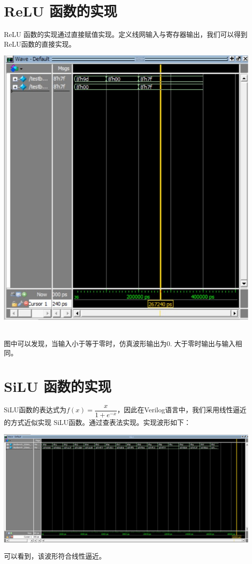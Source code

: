 \documentclass[a4paper]{article}
\begin{document}
\section{ReLU 函数的实现}
ReLU 函数的实现通过直接赋值实现。定义线网输入与寄存器输出，我们可以得到ReLU函数的直接实现。\\
\centerline{\includegraphics[scale=1.0]{relu.jpg}}\\
图中可以发现，当输入小于等于零时，仿真波形输出为0. 大于零时输出与输入相同。
\section{SiLU 函数的实现}
SiLU函数的表达式为$f(x)=\dfrac{x}{1+e^{-x}}$，因此在Verilog语言中，我们采用线性逼近的方式近似实现
SiLU函数。通过查表法实现。实现波形如下：
\clearpage
\centerline{\includegraphics[scale=0.5]{silu.jpg}}
可以看到，该波形符合线性逼近。
\end{document}
